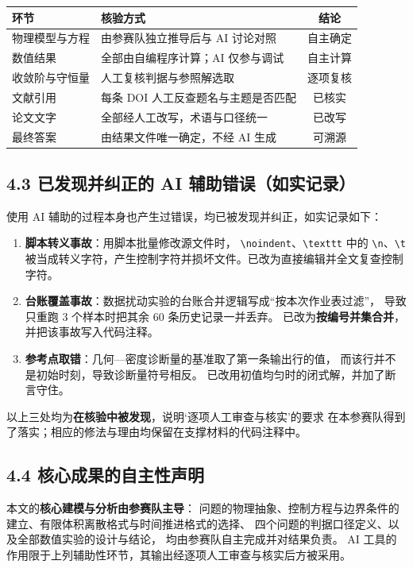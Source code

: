 \documentclass[UTF8, a4paper, 11pt, fontset=windows]{ctexart}
\begin{document}
\begin{table}[h]
  \centering
  \small
  \begin{tabularx}{\textwidth}{@{}lXc@{}}
    \toprule
    环节 & 核验方式 & 结论 \\
    \midrule
    物理模型与方程 & 由参赛队独立推导后与 AI 讨论对照 & 自主确定 \\
    数值结果 & 全部由自编程序计算；AI 仅参与调试 & 自主计算 \\
    收敛阶与守恒量 & 人工复核判据与参照解选取 & 逐项复核 \\
    文献引用 & 每条 DOI 人工反查题名与主题是否匹配 & 已核实 \\
    论文文字 & 全部经人工改写，术语与口径统一 & 已改写 \\
    最终答案 & 由结果文件唯一确定，不经 AI 生成 & 可溯源 \\
    \bottomrule
  \end{tabularx}
\end{table}

\subsection*{4.3 已发现并纠正的 AI 辅助错误（如实记录）}

使用 AI 辅助的过程本身也产生过错误，均已被发现并纠正，如实记录如下：

\begin{enumerate}[leftmargin=1.8em, itemsep=2pt]
  \item \textbf{脚本转义事故}：用脚本批量修改源文件时，
    \verb|\noindent|、\verb|\texttt| 中的 \verb|\n|、\verb|\t|
    被当成转义字符，产生控制字符并损坏文件。已改为直接编辑并全文复查控制字符。
  \item \textbf{台账覆盖事故}：数据扰动实验的台账合并逻辑写成``按本次作业表过滤''，
    导致只重跑 3 个样本时把其余 60 条历史记录一并丢弃。
    已改为\textbf{按编号并集合并}，并把该事故写入代码注释。
  \item \textbf{参考点取错}：几何—密度诊断量的基准取了第一条输出行的值，
    而该行并不是初始时刻，导致诊断量符号相反。
    已改用初值均匀时的闭式解，并加了断言守住。
\end{enumerate}

\noindent 以上三处均为\textbf{在核验中被发现}，说明`逐项人工审查与核实'的要求
在本参赛队得到了落实；相应的修法与理由均保留在支撑材料的代码注释中。

\subsection*{4.4 核心成果的自主性声明}

本文的\textbf{核心建模与分析由参赛队主导}：
问题的物理抽象、控制方程与边界条件的建立、有限体积离散格式与时间推进格式的选择、
四个问题的判据口径定义、以及全部数值实验的设计与结论，
均由参赛队自主完成并对结果负责。
AI 工具的作用限于上列辅助性环节，其输出经逐项人工审查与核实后方被采用。
\end{document}
